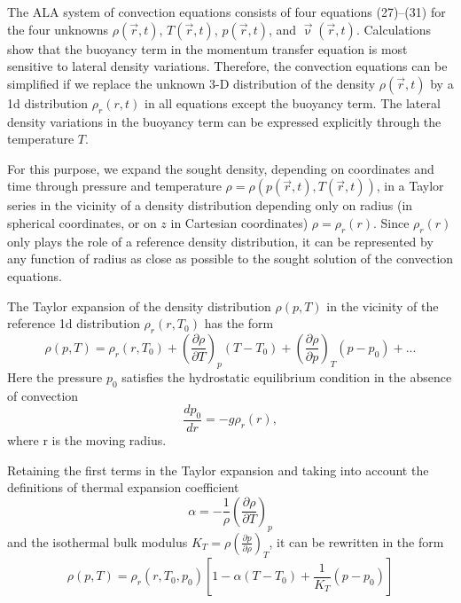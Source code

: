 \documentclass[a4paper,11pt]{article}
\begin{document}
\begin{displayquote}
{\color{darkgray}

The ALA system of convection equations consists of four equations (27)–(31) 
for the four unknowns $\rho(\vec{r}, t)$, $T(\vec{r}, t)$, 
$p(\vec{r}, t)$, and $\vec\upnu(\vec{r}, t)$. Calculations show that the
buoyancy term in the momentum transfer equation is
most sensitive to lateral density variations. Therefore,
the convection equations can be simplified if we replace
the unknown 3-D distribution of the density $\rho(\vec{r}, t)$ by
a 1d distribution $\rho_r(r, t)$ in all equations except the
buoyancy term. The lateral density variations in the
buoyancy term can be expressed explicitly through the
temperature $T$.

For this purpose, we expand the sought density,
depending on coordinates and time through pressure
and temperature $\rho = \rho(p(\vec{r}, t), T(\vec{r}, t))$, in a Taylor
series in the vicinity of a density distribution depending
only on radius (in spherical coordinates, or on $z$ in Cartesian coordinates) 
$\rho = \rho_r(r)$. Since $\rho_r(r)$ only plays the
role of a reference density distribution, it can be represented by any function of 
radius as close as possible to the sought solution of the convection equations.

The Taylor expansion of the density distribution $\rho(p,T)$ in the vicinity of 
the reference 1d distribution $\rho_r(r,T_0)$ has the form
\[
\rho(p,T) = \rho_r(r,T_0) + 
\left(  \frac{\partial \rho}{\partial T}  \right)_p (T-T_0) + 
\left(  \frac{\partial \rho}{\partial p}  \right)_T (p-p_0) + ...
\]
Here the pressure $p_0$ satisfies the hydrostatic equilibrium condition in the absence of convection
\[
\frac{dp_0}{dr} = - g \rho_r(r),
\]
where r is the moving radius.

Retaining the first terms in the Taylor expansion and
taking into account the definitions of thermal expansion
coefficient 
\[
\alpha = - \frac{1}{\rho} \left(  \frac{\partial \rho}{\partial T}  \right)_p 
\]
and the isothermal bulk modulus $K_T = \rho  \left(  \frac{\partial p}{\partial \rho}  \right)_T$, 
it can be rewritten in the form
\[
\rho(p,T) = \rho_r(r,T_0,p_0) 
\left[
1-\alpha (T-T_0) + \frac{1}{K_T}  (p-p_0) 
\right]
\]


}
\end{displayquote}





\newpage
\end{document}

